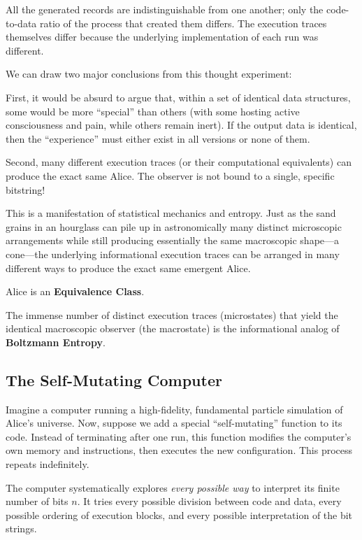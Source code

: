All the generated records are indistinguishable from one another; only the code-to-data ratio of the process that created them differs. 
The execution traces themselves differ because the underlying implementation of each run was different.

We can draw two major conclusions from this thought experiment:

First, it would be absurd to argue that, within a set of identical data structures, some would be more ``special'' than others (with some hosting active consciousness and pain, while others remain inert). 
If the output data is identical, then the ``experience'' must either exist in all versions or none of them.

Second, many different execution traces (or their computational equivalents) can produce the exact same Alice. 
The observer is not bound to a single, specific bitstring!

This is a manifestation of statistical mechanics and entropy. 
Just as the sand grains in an hourglass can pile up in astronomically many distinct microscopic arrangements while still producing essentially the same macroscopic shape---a cone---the underlying informational execution traces can be arranged in many different ways to produce the exact same emergent Alice.

Alice is an \textbf{Equivalence Class}.

The immense number of distinct execution traces (microstates) that yield the identical macroscopic observer (the macrostate) is the informational analog of \textbf{Boltzmann Entropy}.


\subsection*{The Self-Mutating Computer}

Imagine a computer running a high-fidelity, fundamental particle simulation of Alice's universe. 
Now, suppose we add a special ``self-mutating'' function to its code. 
Instead of terminating after one run, this function modifies the computer's own memory and instructions, then executes the new configuration. 
This process repeats indefinitely.

The computer systematically explores \emph{every possible way} to interpret its finite number of bits $n$. 
It tries every possible division between code and data, every possible ordering of execution blocks, and every possible interpretation of the bit strings. 

